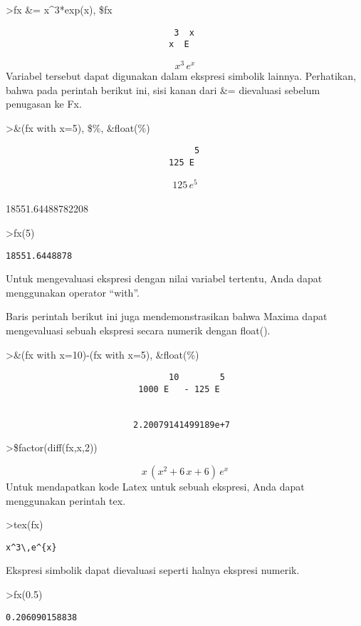 \documentclass[
]{book}
\begin{document}
\textgreater fx \&= x\^{}3*exp(x), \$fx

\begin{verbatim}
                                 3  x
                                x  E
\end{verbatim}

\[x^3\,e^{x}\]Variabel tersebut dapat digunakan dalam ekspresi simbolik lainnya. Perhatikan, bahwa pada perintah berikut ini, sisi kanan dari \&= dievaluasi sebelum penugasan ke Fx.

\textgreater\&(fx with x=5), \$\%, \&float(\%)

\begin{verbatim}
                                     5
                                125 E
\end{verbatim}

\[125\,e^5\]\\
18551.64488782208

\textgreater fx(5)

\begin{verbatim}
18551.6448878
\end{verbatim}

Untuk mengevaluasi ekspresi dengan nilai variabel tertentu, Anda dapat menggunakan operator ``with''.

Baris perintah berikut ini juga mendemonstrasikan bahwa Maxima dapat mengevaluasi sebuah ekspresi secara numerik dengan float().

\textgreater\&(fx with x=10)-(fx with x=5), \&float(\%)

\begin{verbatim}
                                10        5
                          1000 E   - 125 E


                         2.20079141499189e+7
\end{verbatim}

\textgreater\$factor(diff(fx,x,2))

\[x\,\left(x^2+6\,x+6\right)\,e^{x}\]Untuk mendapatkan kode Latex untuk sebuah ekspresi, Anda dapat menggunakan perintah tex.

\textgreater tex(fx)

\begin{verbatim}
x^3\,e^{x}
\end{verbatim}

Ekspresi simbolik dapat dievaluasi seperti halnya ekspresi numerik.

\textgreater fx(0.5)

\begin{verbatim}
0.206090158838
\end{verbatim}
\end{document}
